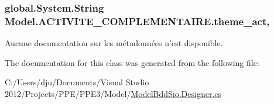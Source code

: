\hypertarget{class_model_1_1_a_c_t_i_v_i_t_e___c_o_m_p_l_e_m_e_n_t_a_i_r_e_ac31dc74da88e2bba3a7878e0de1da922}{
\subsubsection[{theme\-\_\-act}]{\setlength{\rightskip}{0pt plus 5cm}global.\-System.\-String Model.\-A\-C\-T\-I\-V\-I\-T\-E\-\_\-\-C\-O\-M\-P\-L\-E\-M\-E\-N\-T\-A\-I\-R\-E.\-theme\-\_\-act\hspace{0.3cm}{\ttfamily [get]}, {\ttfamily [set]}}}\label{class_model_1_1_a_c_t_i_v_i_t_e___c_o_m_p_l_e_m_e_n_t_a_i_r_e_ac31dc74da88e2bba3a7878e0de1da922}


Aucune documentation sur les métadonnées n'est disponible. 



The documentation for this class was generated from the following file\-:\begin{DoxyCompactItemize}
\item 
C\-:/\-Users/dju/\-Documents/\-Visual Studio 2012/\-Projects/\-P\-P\-E/\-P\-P\-E3/\-Model/\hyperlink{_model_bdd_sio_8_designer_8cs}{Model\-Bdd\-Sio.\-Designer.\-cs}\end{DoxyCompactItemize}
